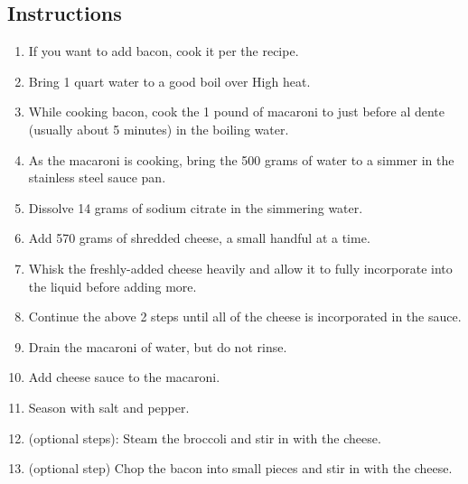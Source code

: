 \begin{multicols}{2}
\subsection*{Instructions}
\begin{enumerate}
    \item If you want to add bacon, cook it per the  recipe.
    \item Bring 1 quart water to a good boil over High heat.
    \item While cooking bacon, cook the 1 pound of macaroni to just before al dente (usually about 5 minutes) in the boiling water.
    \item As the macaroni is cooking, bring the 500 grams of water to a simmer in the stainless steel sauce pan.
    \item Dissolve 14 grams of sodium citrate in the simmering water.
    \item Add 570 grams of shredded cheese, a small handful at a time.
    \item Whisk the freshly-added cheese heavily and allow it to fully incorporate into the liquid before adding more.
    \item Continue the above 2 steps until all of the cheese is incorporated in the sauce.
    \item Drain the macaroni of water, but do not rinse.
    \item Add cheese sauce to the macaroni.
    \item Season with salt and pepper.
    \item (optional steps): Steam the broccoli and stir in with the cheese.
    \item (optional step) Chop the bacon into small pieces and stir in with the cheese.

\end{enumerate}


\end{multicols}
